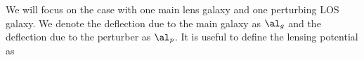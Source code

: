 We will focus on the case with one main lens galaxy and one perturbing LOS galaxy. We denote the deflection due to the main galaxy as $\al_{g}$ and the deflection due to the perturber as $\al_p$. It is useful to define the lensing potential as